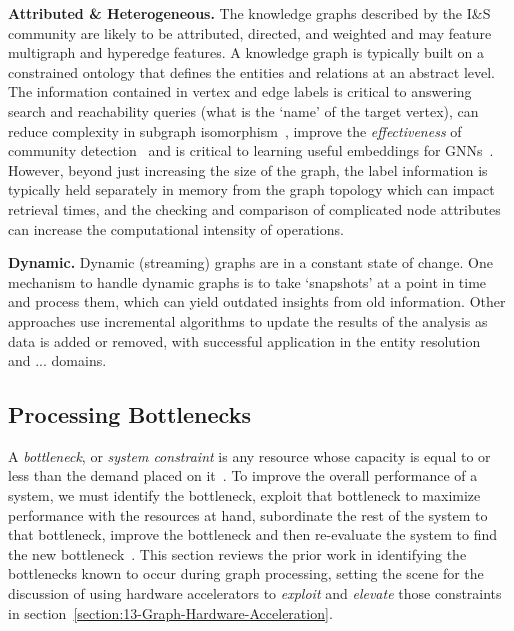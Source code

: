 \textbf{Attributed \& Heterogeneous.}
The knowledge graphs described by the I\&S community are likely to be attributed, directed, and weighted and may feature multigraph and hyperedge features. 
A knowledge graph is typically built on a constrained ontology that defines the entities and relations at an abstract level. 
The information contained in vertex and edge labels is critical to answering search and reachability queries (what is the `name' of the target vertex), can reduce complexity in subgraph isomorphism~\cite{Mccreesh2018}, improve the \textit{effectiveness} of community detection~\cite{Zhang2020} and is critical to learning useful embeddings for GNNs~\cite{Hamilton2017}. 
However, beyond just increasing the size of the graph, the label information is typically held separately in memory from the graph topology which can impact retrieval times, and the checking and comparison of complicated node attributes can increase the computational intensity of operations. 

\textbf{Dynamic.}
Dynamic (streaming) graphs are in a constant state of change. 
One mechanism to handle dynamic graphs is to take `snapshots' at a point in time and process them, which can yield outdated insights from old information.  
Other approaches use incremental algorithms to update the results of the analysis as data is added or removed, with successful application in the entity resolution~\cite{Tauer2019} and ... domains.~

\subsection{Processing Bottlenecks}
\label{section:126-processing-bottlenecks}


A \textit{bottleneck}, or \textit{system constraint} is any resource whose capacity is equal to or less than the demand placed on it~\cite{Goldratt2004}. 
To improve the overall performance of a system, we must identify the bottleneck, exploit that bottleneck to maximize performance with the resources at hand, subordinate the rest of the system to that bottleneck, improve the bottleneck and then re-evaluate the system to find the new bottleneck~\cite{Goldratt1990}.
This section reviews the prior work in identifying the bottlenecks known to occur during graph processing, setting the scene for the discussion of using hardware accelerators to \textit{exploit} and \textit{elevate} those constraints in section~\ref{section:13-Graph-Hardware-Acceleration}.

